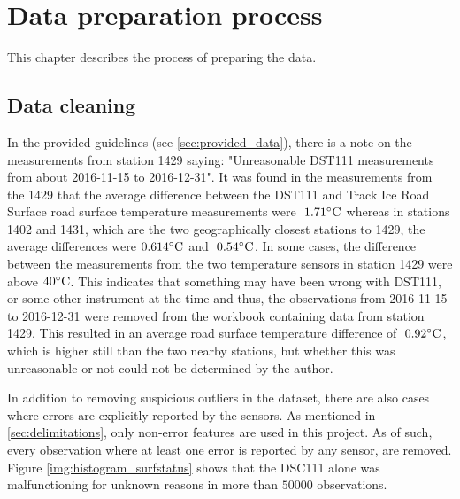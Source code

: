 \chapter{Data preparation process}
This chapter describes the process of preparing the data.


\section{Data cleaning} \label{sec:datacleaning}
	 In the provided guidelines (see \ref{sec:provided_data}), there is a note on the measurements from station 1429 saying: "Unreasonable DST111 measurements from about 2016-11-15 to 2016-12-31". It was found in the measurements from the 1429 that the average difference between the DST111 and Track Ice Road Surface road surface temperature measurements were $~1.71 \celsius$ whereas in stations 1402 and 1431, which are the two geographically closest stations to 1429, the average differences were $0.614 \celsius$ and  $~0.54 \celsius$. In some cases, the difference between the measurements from the two temperature sensors in station 1429 were above $40 \celsius$. This indicates that something may have been wrong with DST111, or some other instrument at the time and thus, the observations from 2016-11-15 to 2016-12-31 were removed from the workbook containing data from station 1429. This resulted in an average road surface temperature difference of $~0.92 \celsius$, which is higher still than the two nearby stations, but whether this was unreasonable or not could not be determined by the author. 

	In addition to removing suspicious outliers in the dataset, there are also cases where errors are explicitly reported by the sensors. As mentioned in \ref{sec:delimitations}, only non-error features are used in this project. As of such, every observation where at least one error is reported by any sensor, are removed. Figure \ref{img:histogram_surfstatus} shows that the DSC111 alone was malfunctioning for unknown reasons in more than $50 000$ observations. 

